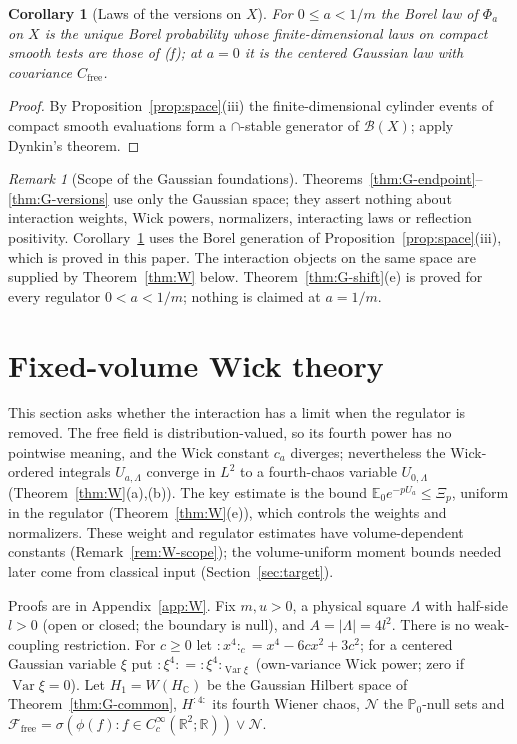 \documentclass[11pt]{article}
\theoremstyle{plain}
\newtheorem{corollary}[theorem]{Corollary}
\theoremstyle{definition}
\theoremstyle{remark}
\newtheorem{remark}[theorem]{Remark}
\newcommand{\R}{\mathbb{R}}
\newcommand{\C}{\mathbb{C}}
\newcommand{\E}{\mathbb{E}}
\newcommand{\PP}{\mathbb{P}}
\newcommand{\cB}{\mathcal{B}}
\newcommand{\cF}{\mathcal{F}}
\newcommand{\cN}{\mathcal{N}}
\newcommand{\Cfree}{C_{\mathrm{free}}}
\DeclareMathOperator{\Var}{Var}
\begin{document}
\begin{corollary}[Laws of the versions on $X$]\label{cor:G-laws}
For $0\le a<1/m$ the Borel law of $\Phi_a$ on $X$ is the unique Borel probability
whose finite-dimensional laws on compact smooth tests are those of (f); at $a=0$
it is the centered Gaussian law with covariance $\Cfree$.
\end{corollary}

\begin{proof}
By Proposition~\ref{prop:space}(iii) the finite-dimensional cylinder events of
compact smooth evaluations form a $\cap$-stable generator of $\cB(X)$; apply
Dynkin's theorem.
\end{proof}

\begin{remark}[Scope of the Gaussian foundations]\label{rem:G-scope}
Theorems~\ref{thm:G-endpoint}--\ref{thm:G-versions} use only the Gaussian space;
they assert nothing about interaction weights, Wick powers, normalizers,
interacting laws or reflection positivity. Corollary~\ref{cor:G-laws} uses the
Borel generation of Proposition~\ref{prop:space}(iii), which is proved in this
paper. The interaction objects on the same space are supplied by
Theorem~\ref{thm:W} below. Theorem~\ref{thm:G-shift}(e) is proved for every
regulator $0<a<1/m$; nothing is claimed at $a=1/m$.
\end{remark}

\section{Fixed-volume Wick theory}\label{sec:wick}

This section asks whether the interaction has a limit when the regulator is removed. The free field is distribution-valued, so its fourth power has no pointwise meaning, and the Wick constant $c_a$ diverges; nevertheless the Wick-ordered integrals $U_{a,\Lambda}$ converge in $L^{2}$ to a fourth-chaos variable $U_{0,\Lambda}$ (Theorem~\ref{thm:W}(a),(b)). The key estimate is the bound $\E_0e^{-pU_a}\le\Xi_p$, uniform in the regulator (Theorem~\ref{thm:W}(e)), which controls the weights and normalizers. These weight and regulator estimates have volume-dependent constants (Remark~\ref{rem:W-scope}); the volume-uniform moment bounds needed later come from classical input (Section~\ref{sec:target}).

Proofs are in Appendix~\ref{app:W}. Fix $m,u>0$, a physical square $\Lambda$ with
half-side $l>0$ (open or closed; the boundary is null), and $A=|\Lambda|=4l^{2}$.
There is no weak-coupling restriction. For $c\ge0$ let
${:}x^{4}{:}_c=x^{4}-6cx^{2}+3c^{2}$; for a centered Gaussian variable $\xi$ put
${:}\xi^{4}{:}={:}\xi^{4}{:}_{\Var\xi}$ (own-variance Wick power; zero if $\Var\xi=0$).
Let $H_1=W(H_{\C})$ be the Gaussian Hilbert space of Theorem~\ref{thm:G-common},
$H^{{:}4{:}}$ its fourth Wiener chaos, $\cN$ the $\PP_0$-null sets and
$\cF_{\mathrm{free}}=\sigma(\phi(f):f\in C_c^{\infty}(\R^{2};\R))\vee\cN$.
\end{document}

